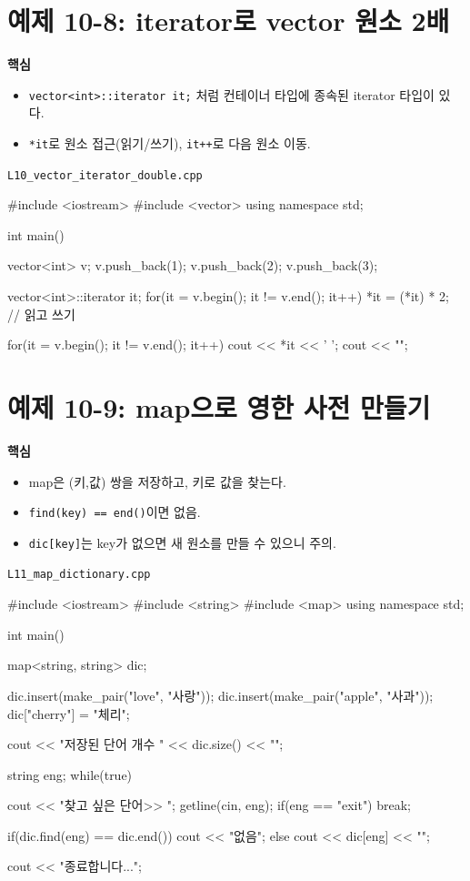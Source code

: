 \documentclass[11pt,a4paper]{article}
\newcommand{\filetag}[1]{\texttt{\color{Accent}#1}}
\begin{document}
\section{예제 10-8: iterator로 vector 원소 2배}
\begin{GoalBox}
\textbf{핵심}
\begin{itemize}[leftmargin=18pt]
  \item \texttt{vector<int>::iterator it;} 처럼 컨테이너 타입에 종속된 iterator 타입이 있다.
  \item \texttt{*it}로 원소 접근(읽기/쓰기), \texttt{it++}로 다음 원소 이동.
\end{itemize}
\end{GoalBox}

\noindent\filetag{L10\_vector\_iterator\_double.cpp}
\begin{cppcode}
#include <iostream>
#include <vector>
using namespace std;

int main() {
    vector<int> v;
    v.push_back(1);
    v.push_back(2);
    v.push_back(3);

    vector<int>::iterator it;
    for(it = v.begin(); it != v.end(); it++) {
        *it = (*it) * 2; // 읽고 쓰기
    }

    for(it = v.begin(); it != v.end(); it++)
        cout << *it << ' ';
    cout << "\n";
}
\end{cppcode}

\section{예제 10-9: map으로 영한 사전 만들기}
\begin{GoalBox}
\textbf{핵심}
\begin{itemize}[leftmargin=18pt]
  \item map은 (키,값) 쌍을 저장하고, 키로 값을 찾는다.
  \item \texttt{find(key) == end()}이면 없음.
  \item \texttt{dic[key]}는 key가 없으면 새 원소를 만들 수 있으니 주의.
\end{itemize}
\end{GoalBox}

\noindent\filetag{L11\_map\_dictionary.cpp}
\begin{cppcode}
#include <iostream>
#include <string>
#include <map>
using namespace std;

int main() {
    map<string, string> dic;

    dic.insert(make_pair("love", "사랑"));
    dic.insert(make_pair("apple", "사과"));
    dic["cherry"] = "체리";

    cout << "저장된 단어 개수 " << dic.size() << "\n";

    string eng;
    while(true) {
        cout << "찾고 싶은 단어>> ";
        getline(cin, eng);
        if(eng == "exit") break;

        if(dic.find(eng) == dic.end())
            cout << "없음\n";
        else
            cout << dic[eng] << "\n";
    }
    cout << "종료합니다...\n";
}
\end{cppcode}
\end{document}
